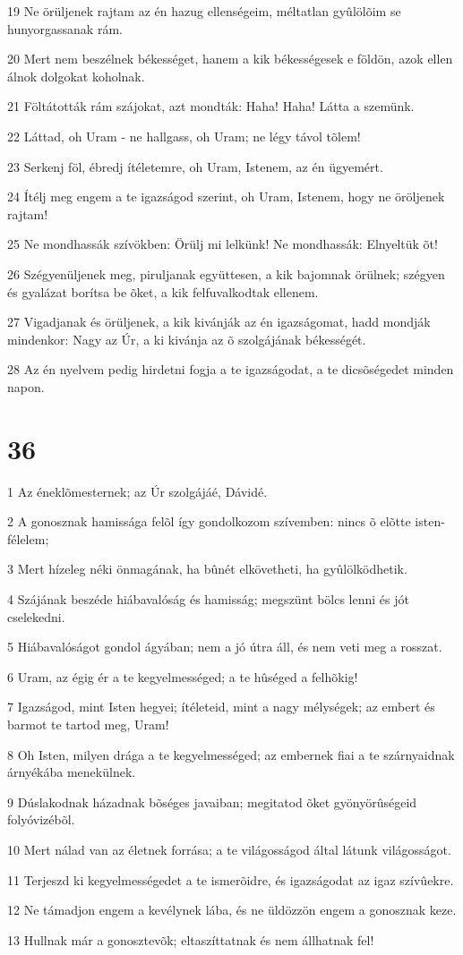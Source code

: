 \par 19 Ne örüljenek rajtam az én hazug ellenségeim, méltatlan gyûlölõim se hunyorgassanak rám.
\par 20 Mert nem beszélnek békességet, hanem a kik békességesek e földön, azok ellen álnok dolgokat koholnak.
\par 21 Föltátották rám szájokat, azt mondták: Haha! Haha! Látta a szemünk.
\par 22 Láttad, oh Uram - ne hallgass, oh Uram; ne légy távol tõlem!
\par 23 Serkenj föl, ébredj ítéletemre, oh Uram, Istenem, az én ügyemért.
\par 24 Ítélj meg engem a te igazságod szerint, oh Uram, Istenem, hogy ne öröljenek rajtam!
\par 25 Ne mondhassák szívökben: Örülj mi lelkünk! Ne mondhassák: Elnyeltük õt!
\par 26 Szégyenüljenek meg, piruljanak együttesen, a kik bajomnak örülnek; szégyen és gyalázat borítsa be õket, a kik felfuvalkodtak ellenem.
\par 27 Vigadjanak és örüljenek, a kik kivánják az én igazságomat, hadd mondják mindenkor: Nagy az Úr, a ki kivánja az õ szolgájának békességét.
\par 28 Az én nyelvem pedig hirdetni fogja a te igazságodat, a te dicsõségedet minden napon.

\chapter{36}

\par 1 Az éneklõmesternek; az Úr szolgájáé, Dávidé.
\par 2 A gonosznak hamissága felõl így gondolkozom szívemben: nincs õ elõtte isten-félelem;
\par 3 Mert hízeleg néki önmagának, ha bûnét elkövetheti, ha gyûlölködhetik.
\par 4 Szájának beszéde hiábavalóság és hamisság; megszünt bölcs lenni és jót cselekedni.
\par 5 Hiábavalóságot gondol ágyában; nem a jó útra áll, és nem veti meg a rosszat.
\par 6 Uram, az égig ér a te kegyelmességed; a te hûséged a felhõkig!
\par 7 Igazságod, mint Isten hegyei; ítéleteid, mint a nagy mélységek; az embert és barmot te tartod meg, Uram!
\par 8 Oh Isten, milyen drága a te kegyelmességed; az embernek fiai a te szárnyaidnak árnyékába menekülnek.
\par 9 Dúslakodnak házadnak bõséges javaiban; megitatod õket gyönyörûségeid folyóvizébõl.
\par 10 Mert nálad van az életnek forrása; a te világosságod által látunk világosságot.
\par 11 Terjeszd ki kegyelmességedet a te ismerõidre, és igazságodat az igaz szívûekre.
\par 12 Ne támadjon engem a kevélynek lába, és ne üldözzön engem a gonosznak keze.
\par 13 Hullnak már a gonosztevõk; eltaszíttatnak és nem állhatnak fel!

